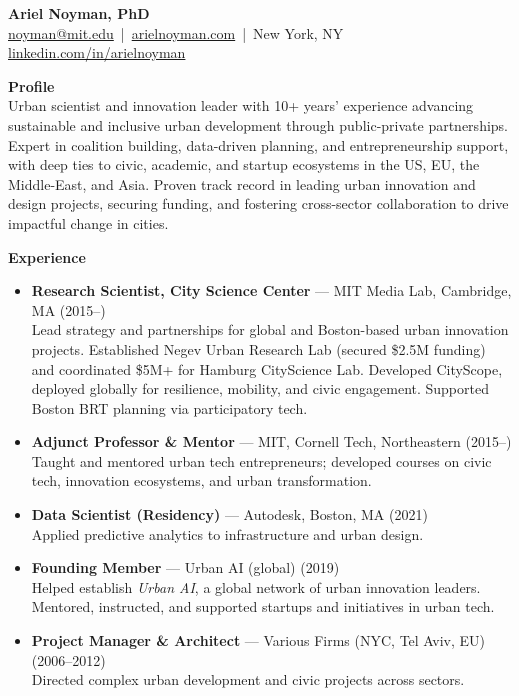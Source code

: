 \documentclass[a4paper,10pt]{article}
\begin{document}
\begin{center}
    {\LARGE \textbf{Ariel Noyman, PhD}} \\
    \href{mailto:noyman@mit.edu}{noyman@mit.edu} \,|\, \href{http://arielnoyman.com}{arielnoyman.com} \,|\, New York, NY \\
    \href{https://www.linkedin.com/in/arielnoyman}{linkedin.com/in/arielnoyman}
\end{center}


\vspace{2em}

\noindent \textbf{Profile} \\
Urban scientist and innovation leader with 10+ years’ experience advancing sustainable and inclusive urban development through public-private partnerships. Expert in coalition building, data-driven planning, and entrepreneurship support, with deep ties to civic, academic, and startup ecosystems in the US, EU, the Middle-East, and Asia. Proven track record in leading urban innovation and design projects, securing funding, and fostering cross-sector collaboration to drive impactful change in cities.



\vspace{2em}

\noindent \textbf{Experience}

\begin{itemize}[leftmargin=1.2em]
    \item \textbf{Research Scientist, City Science Center} — MIT Media Lab, Cambridge, MA (2015–) \\
          Lead strategy and partnerships for global and Boston-based urban innovation projects. Established Negev Urban Research Lab (secured \$2.5M funding) and coordinated \$5M+ for Hamburg CityScience Lab. Developed CityScope, deployed globally for resilience, mobility, and civic engagement. Supported Boston BRT planning via participatory tech.

    \item \textbf{Adjunct Professor \& Mentor} — MIT, Cornell Tech, Northeastern (2015–) \\
          Taught and mentored urban tech entrepreneurs; developed courses on civic tech, innovation ecosystems, and urban transformation.

    \item \textbf{Data Scientist (Residency)} — Autodesk, Boston, MA (2021) \\
          Applied predictive analytics to infrastructure and urban design.

    \item \textbf{Founding Member} — Urban AI (global) (2019) \\
          Helped establish \textit{Urban AI}, a global network of urban innovation leaders. Mentored, instructed, and supported startups and initiatives in urban tech.

    \item \textbf{Project Manager \& Architect} — Various Firms (NYC, Tel Aviv, EU) (2006–2012) \\
          Directed complex urban development and civic projects across sectors.
\end{itemize}
\end{document}
